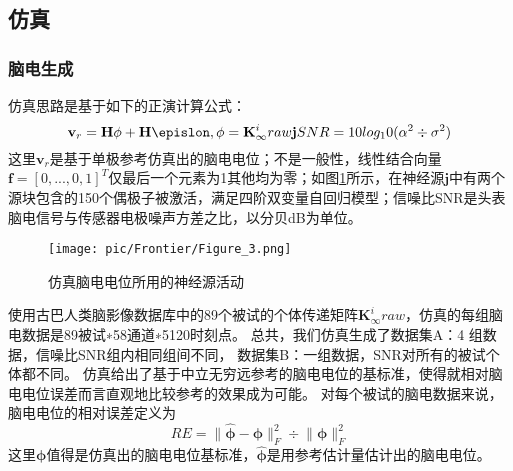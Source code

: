 \subsection{仿真}
\subsubsection{脑电生成}
仿真思路是基于如下的正演计算公式：
\begin{equation}\label{3.18}
\mathbf{v}_r=\mathbf{H\phi}+\mathbf{H\epislon}, \mathbf{\phi}=\mathbf{K}_{\infty}^iraw\mathbf{j}
SNR=10log_10(\alpha^2\div{\sigma^2})
\end{equation}
这里$\mathbf{v}_r$是基于单极参考仿真出的脑电电位；不是一般性，线性结合向量$\mathbf{f}=[0,...,0,1]^T$仅最后一个元素为1其他均为零；如图\ref{3.3}所示，在神经源$\mathbf{j}$中有两个源块包含的150个偶极子被激活，满足四阶双变量自回归模型；信噪比SNR是头表脑电信号与传感器电极噪声方差之比，以分贝dB为单位。
\begin{figure}[!ht]
	\centering
	\texttt{[image: pic/Frontier/Figure\_3.png]}
	\caption{仿真脑电电位所用的神经源活动}
	\label{3.3}
\end{figure}
使用古巴人类脑影像数据库中的89个被试的个体传递矩阵$\mathbf{K}_{\infty}^iraw$，仿真的每组脑电数据是89被试∗58通道∗5120时刻点。 总共，我们仿真生成了数据集A：4 组数据，信噪比SNR组内相同组间不同， 数据集B：一组数据，SNR对所有的被试个体都不同。 仿真给出了基于中立无穷远参考的脑电电位的基标准，使得就相对脑电电位误差而言直观地比较参考的效果成为可能。 对每个被试的脑电数据来说，脑电电位的相对误差定义为
\begin{equation}\label{3.19}
RE=\lVert\hat{\mathbf{\phi}}-\mathbf{\phi}\rVert^2_F\div{\lVert\mathbf{\phi}\rVert^2_F}
\end{equation}
这里$\mathbf{\phi}$值得是仿真出的脑电电位基标准，$\hat{\mathbf{\phi}}$是用参考估计量估计出的脑电电位。

